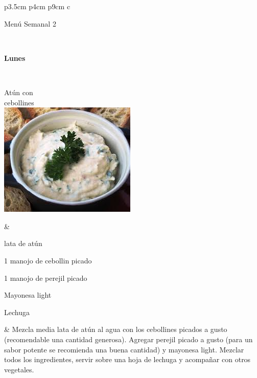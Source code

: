 \documentclass[menu.tex]{subfiles}
\begin{document}
            
    
    \begin{tabular} {p{3.5cm} p{4cm} p{9cm}}        
     { c }{\begin{LARGE}Menú Semanal 2\end{LARGE}}\\
    \hline
    
\pbox{20cm}
{
\rule{0pt}{3ex}\begin{large}\textbf{Lunes}\end{large}\\ 
\rule{0pt}{2ex}Atún con \\cebollines \\
\includegraphics[scale=0.4]{atun-cebollines} 
} & 
\vspace{-2cm}
\begin{compactitem} 
\begin{footnotesize}
\item {} lata de atún
\item 1 manojo de cebollin picado
\item 1 manojo de perejil picado
\item Mayonesa light
\item Lechuga
\end{footnotesize}
\end{compactitem}&
\vspace{-2cm}
Mezcla media lata de atún al agua con los cebollines picados a gusto (recomendable una cantidad generosa). Agregar perejil picado a gusto (para un sabor potente se recomienda una buena cantidad) y mayonesa light. Mezclar todos los ingredientes, servir sobre una hoja de lechuga y acompañar con otros vegetales.\\
\hline
    

\end{tabular}
\end{document}
